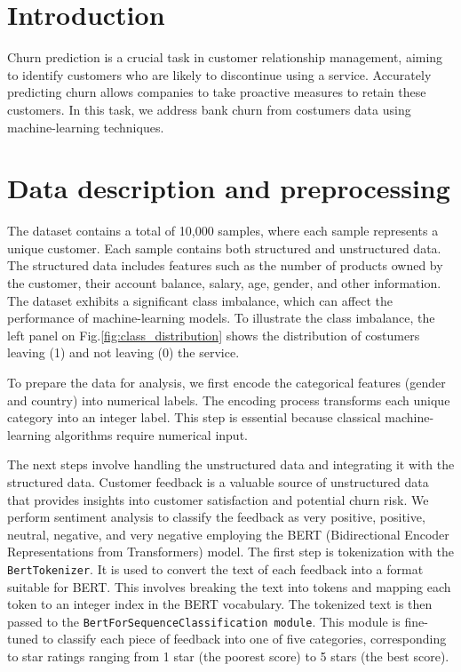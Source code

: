 \documentclass[12pt]{article}
\begin{document}
\section{Introduction}
Churn prediction is a crucial task in customer relationship management, aiming to identify customers who are likely to discontinue using a service. Accurately predicting churn allows companies to take proactive measures to retain these customers. In this task, we address bank churn from costumers data using machine-learning techniques. 

\section{Data description and preprocessing}
The dataset contains a total of 10,000 samples, where each sample represents a unique customer. Each sample contains both structured and unstructured data. The structured data includes features such as the number of products owned by the customer, their account balance, salary, age, gender, and other information. The dataset exhibits a significant class imbalance, which can affect the performance of machine-learning models. To illustrate the class imbalance, the left panel on Fig.\ref{fig:class_distribution} shows the distribution of costumers leaving (1) and not leaving (0) the service. 

To prepare the data for analysis, we first encode the categorical features (gender and country) into numerical labels. The encoding process transforms each unique category into an integer label. This step is essential because classical machine-learning algorithms require numerical input. 

The next steps involve handling the unstructured data and integrating it with the structured data. Customer feedback is a valuable source of unstructured data that provides insights into customer satisfaction and potential churn risk.  We perform sentiment analysis to classify the feedback as very positive, positive, neutral, negative, and very negative employing the BERT (Bidirectional Encoder Representations from Transformers) model. The first step is tokenization with the \texttt{BertTokenizer}. It is used to convert the text of each feedback into a format suitable for BERT. This involves breaking the text into tokens and mapping each token to an integer index in the BERT vocabulary. The tokenized text is then passed to the \texttt{BertForSequenceClassification module}. This module is fine-tuned to classify each piece of feedback into one of five categories, corresponding to star ratings ranging from 1 star (the poorest score) to 5 stars (the best score).
\end{document}
